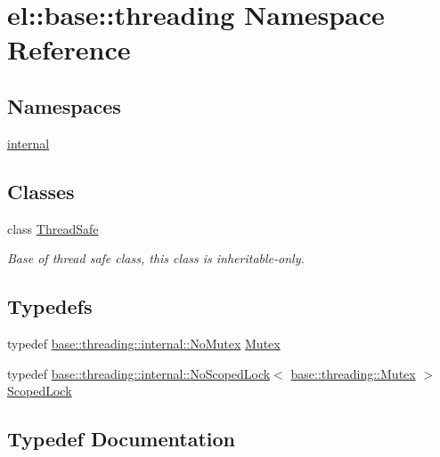 \hypertarget{namespaceel_1_1base_1_1threading}{}\section{el\+:\+:base\+:\+:threading Namespace Reference}
\label{namespaceel_1_1base_1_1threading}
\subsection*{Namespaces}
\begin{DoxyCompactItemize}
\item 
 \hyperlink{namespaceel_1_1base_1_1threading_1_1internal}{internal}
\end{DoxyCompactItemize}
\subsection*{Classes}
\begin{DoxyCompactItemize}
\item 
class \hyperlink{classel_1_1base_1_1threading_1_1_thread_safe}{Thread\+Safe}
\begin{DoxyCompactList}\small\item\em Base of thread safe class, this class is inheritable-\/only. \end{DoxyCompactList}\end{DoxyCompactItemize}
\subsection*{Typedefs}
\begin{DoxyCompactItemize}
\item 
typedef \hyperlink{classel_1_1base_1_1threading_1_1internal_1_1_no_mutex}{base\+::threading\+::internal\+::\+No\+Mutex} \hyperlink{namespaceel_1_1base_1_1threading_ab9400eb234a82878e8458a65f9774320}{Mutex}
\item 
typedef \hyperlink{classel_1_1base_1_1threading_1_1internal_1_1_no_scoped_lock}{base\+::threading\+::internal\+::\+No\+Scoped\+Lock}$<$ \hyperlink{namespaceel_1_1base_1_1threading_ab9400eb234a82878e8458a65f9774320}{base\+::threading\+::\+Mutex} $>$ \hyperlink{namespaceel_1_1base_1_1threading_a84bb1940fe98386c8907c1f4ceac5718}{Scoped\+Lock}
\end{DoxyCompactItemize}


\subsection{Typedef Documentation}
\hypertarget{namespaceel_1_1base_1_1threading_ab9400eb234a82878e8458a65f9774320}{}
